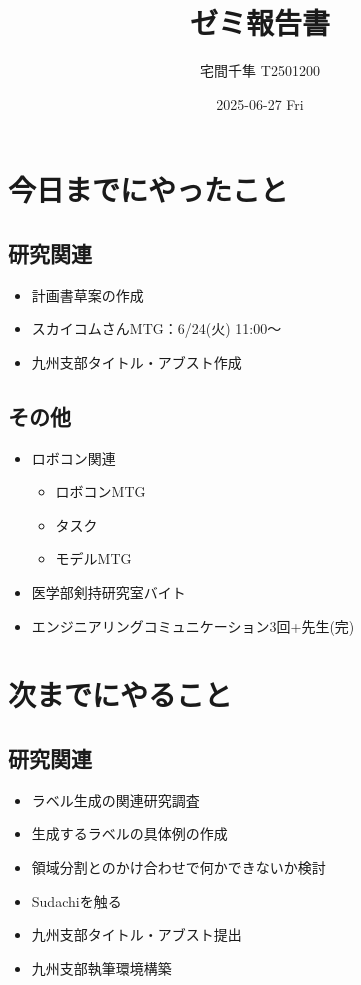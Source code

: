 \documentclass[uplatex, onecolumn, 10pt]{jsarticle}
\begin{document}
\title{\vspace{-40mm}\bf{\LARGE{ゼミ報告書}}}
\author{\vspace{-40mm}宅間千隼 T2501200}
\date{2025-06-27 Fri}
\maketitle


\section{今日までにやったこと}

\subsection*{研究関連} 
\begin{itemize}
	\item 計画書草案の作成
	\item スカイコムさんMTG：6/24(火) 11:00～
	\item 九州支部タイトル・アブスト作成
\end{itemize}

\subsection*{その他}
\begin{itemize}
	\item ロボコン関連
	\begin{itemize}
		\item ロボコンMTG
		\item タスク
		\item モデルMTG
	\end{itemize}
	\item 医学部剣持研究室バイト
    \item エンジニアリングコミュニケーション3回+先生(完)
\end{itemize}


\section{次までにやること}

\subsection*{研究関連}
\begin{itemize}
	\item ラベル生成の関連研究調査
	\item 生成するラベルの具体例の作成
	\item 領域分割とのかけ合わせで何かできないか検討
	\item Sudachiを触る
	\item 九州支部タイトル・アブスト提出
	\item 九州支部執筆環境構築
\end{itemize}
\end{document}
